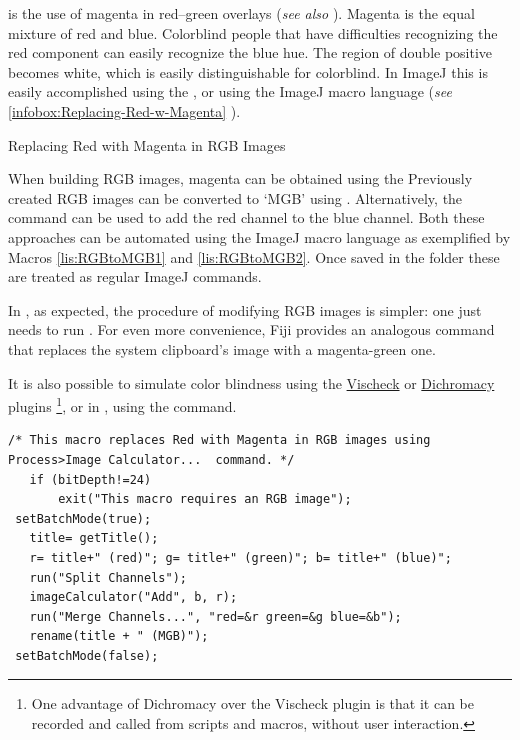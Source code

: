 is the use of magenta in red--green overlays (\emph{see also} \cite{Landini:2009p19625}).
Magenta is the equal mixture of red and blue. Colorblind people that
have difficulties recognizing the red component can easily recognize
the blue hue. The region of double positive becomes white, which is
easily distinguishable for colorblind. In ImageJ this is easily accomplished
using the ,
or using the ImageJ macro language (\emph{see} \ref{infobox:Replacing-Red-w-Magenta}
). 
\begin{infobox}
\caption{\label{infobox:Replacing-Red-w-Magenta}Replacing Red with Magenta
in RGB Images}


When building RGB images, magenta can be obtained using the 
Previously created RGB images can be converted to `MGB'
using .
Alternatively, the \textsf{}
command can be used to add the red channel to the blue channel. Both
these approaches can be automated using the ImageJ macro language
as exemplified by Macros \eqref{lis:RGBtoMGB1} and \eqref{lis:RGBtoMGB2}.
Once saved in the  folder these 
are treated as regular ImageJ commands.\medskip{}


In , as expected, the procedure of modifying
RGB images is simpler: one just needs to run \textsf{}.
For even more convenience, Fiji provides an analogous command that
replaces the system clipboard's image with a magenta-green one.
\end{infobox}


It is also possible to simulate color blindness using the \href{http://www.vischeck.com/downloads/}{Vischeck}
or \href{http://www.dentistry.bham.ac.uk/landinig/software/dichromacy/dichromacy.html}{Dichromacy}
plugins%
\footnote{One advantage of Dichromacy over the Vischeck plugin is that it can
be recorded and called from scripts and macros, without user interaction.%
}, or in , using the 
command.
\begin{lstlisting}[caption={Replace\,Red\,with\,Magenta.ijm (Using \protect\userinterface{Process\lyxarrow{}Image Calculator\ldots{}})},label={lis:RGBtoMGB2},float=h,showstringspaces=false,tabsize=4]
 /* This macro replaces Red with Magenta in RGB images using Process>Image Calculator...  command. */
   if (bitDepth!=24)
       exit("This macro requires an RGB image");
 setBatchMode(true);
   title= getTitle();
   r= title+" (red)"; g= title+" (green)"; b= title+" (blue)";
   run("Split Channels");
   imageCalculator("Add", b, r);
   run("Merge Channels...", "red=&r green=&g blue=&b");
   rename(title + " (MGB)");
 setBatchMode(false);
\end{lstlisting}



